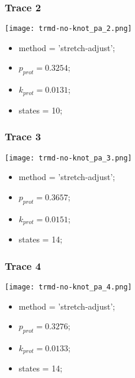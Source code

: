 \begin{minipage}[c]{0.45\textwidth}
\subsubsection{Trace 2}
\begin{minipage}[c]{0.7\textwidth}
    \texttt{[image: trmd-no-knot\_pa\_2.png]}
\end{minipage}
\hfill
\begin{minipage}[c]{0.45\textwidth}
    \begin{itemize}
        \item method = 'stretch-adjust';
        \item $p_{prot}=0.3254$;
        \item $k_{prot}=0.0131$;
        \item states = 10;
    \end{itemize}
\end{minipage}

\subsubsection{Trace 3}
\begin{minipage}[c]{0.7\textwidth}
    \texttt{[image: trmd-no-knot\_pa\_3.png]}
\end{minipage}
\hfill
\begin{minipage}[c]{0.45\textwidth}
    \begin{itemize}
        \item method = 'stretch-adjust';
        \item $p_{prot}=0.3657$;
        \item $k_{prot}=0.0151$;
        \item states = 14;
    \end{itemize}
\end{minipage}

\subsubsection{Trace 4}
\begin{minipage}[c]{0.7\textwidth}
    \texttt{[image: trmd-no-knot\_pa\_4.png]}
\end{minipage}
\hfill
\begin{minipage}[c]{0.45\textwidth}
    \begin{itemize}
        \item method = 'stretch-adjust';
        \item $p_{prot}=0.3276$;
        \item $k_{prot}=0.0133$;
        \item states = 14;
    \end{itemize}
\end{minipage}


\end{minipage}
